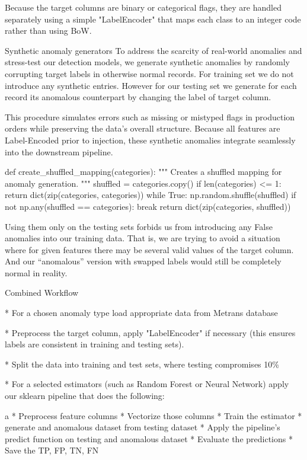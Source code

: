 Because the target columns are binary or categorical flags, they are handled separately using a simple "LabelEncoder" that maps each class to an integer code rather than using BoW.

\secc Synthetic anomaly generators
To address the scarcity of real-world anomalies and stress-test our detection models, we generate synthetic anomalies by randomly corrupting target labels in otherwise normal records. For training set we do not introduce any synthetic entries. However for our testing set we generate for each record its anomalous counterpart by changing the label of target column.

This procedure simulates errors such as missing or mistyped flags in production orders while preserving the data’s overall structure. Because all features are Label-Encoded prior to injection, these synthetic anomalies integrate seamlessly into the downstream pipeline.

\begtt {}
def create_shuffled_mapping(categories):
    """
    Creates a shuffled mapping for anomaly generation.
    """
    shuffled = categories.copy()
    if len(categories) <= 1:
        return dict(zip(categories, categories))
    while True:
        np.random.shuffle(shuffled)
        if not np.any(shuffled == categories):
            break
    return dict(zip(categories, shuffled))
\endtt

Using them only on the testing sets forbids us from introducing any False anomalies into our training data. That is, we are trying to avoid a situation where for given features there may be several valid values of the target column. And our ``anomalous'' version with swapped labels would still be completely normal in reality.

\sec Combined Workflow

\begitems
* For a chosen anomaly type load appropriate data from Metrans database

* Preprocess the target column, apply "LabelEncoder" if necessary (this ensures labels are consistent in training and testing sets).

* Split the data into training and test sets, where testing compromises 10\%

* For a selected estimators (such as Random Forest or Neural Network) apply our sklearn pipeline that does the following:

\begitems \style a
* Preprocess feature columns
* Vectorize those columns
* Train the estimator
* generate and anomalous dataset from testing dataset
* Apply the pipeline's predict function on testing and anomalous dataset
* Evaluate the predictions
* Save the TP, FP, TN, FN
\enditems

